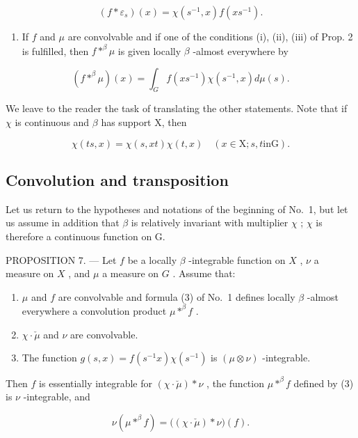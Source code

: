 \[
(f * \varepsilon_ {s}) (x) = \chi (s ^ {- 1}, x) f (x s ^ {- 1}).\tag{4}
\]

\begin{enumerate}
\def\labelenumi{\arabic{enumi})}
\setcounter{enumi}{1}
\tightlist
\item
  If \(f\) and \(\mu\) are convolvable and if one of the conditions (i), (ii), (iii) of Prop. 2 is fulfilled, then \(f *^{\beta} \mu\) is given locally \(\beta\) -almost everywhere by
\end{enumerate}

\[
(f * ^ {\beta} \mu) (x) = \int_ {G} f (x s ^ {- 1}) \chi (s ^ {- 1}, x) d \mu (s).\tag{5}
\]

We leave to the reader the task of translating the other statements. Note that if \(\chi\) is continuous and \(\beta\) has support X, then

\[
\chi (t s, x) = \chi (s, x t) \chi (t, x) \quad (x \in \mathrm{X}; s, t \text {in} \mathrm{G}).\tag{6}
\]

\subsection{Convolution and transposition}

Let us return to the hypotheses and notations of the beginning of No.~1, but let us assume in addition that \(\beta\) is relatively invariant with multiplier \(\chi\) ; \(\chi\) is therefore a continuous function on G.

PROPOSITION 7. --- Let \(f\) be a locally \(\beta\) -integrable function on \(X\) , \(\nu\) a measure on \(X\) , and \(\mu\) a measure on \(G\) . Assume that:

\begin{enumerate}
\def\labelenumi{(\roman{enumi})}
\item
  \(\mu\) and \(f\) are convolvable and formula (3) of No.~1 defines locally \(\beta\) -almost everywhere a convolution product \(\mu *^{\beta} f\) .
\item
  \(\chi \cdot \check{\mu}\) and \(\nu\) are convolvable.
\item
  The function \(g(s,x) = f(s^{-1}x)\chi (s^{-1})\) is \((\mu \otimes \nu)\) -integrable.
\end{enumerate}

Then \(f\) is essentially integrable for \((\chi \cdot \breve{\mu}) * \nu\) , the function \(\mu *^{\beta} f\) defined by (3) is \(\nu\) -integrable, and

\[
\nu (\mu * ^ {\beta} f) = \big ((\chi \cdot \check {\mu}) * \nu \big) (f).\tag{7}
\]

